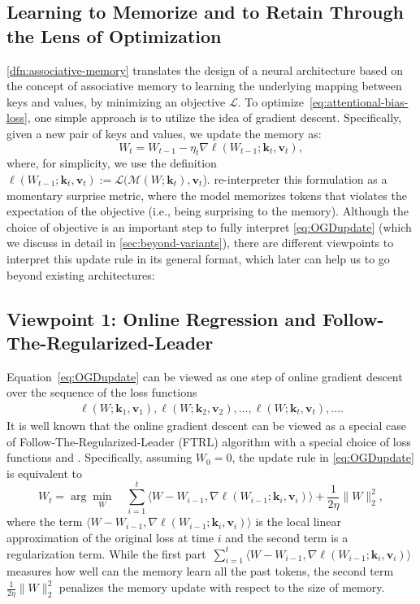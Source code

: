 \documentclass{article}
\newcommand{\citep}{\parencite}
\newcommand{\citet}{\textcite}
\newcommand{\vk}[0]{\mathbf{k}}
\newcommand{\vvv}[0]{\mathbf{v}}
\newcommand{\M}[0]{\mathcal{M}}
\theoremstyle{plain}
\theoremstyle{definition}
\theoremstyle{remark}
\begin{document}
\subsection{Learning to Memorize and to Retain Through the Lens of Optimization}
\autoref{dfn:associative-memory} translates the design of a neural architecture based on the concept of associative memory to learning the underlying mapping between keys and values, by minimizing an objective $\mathcal{L}$. To optimize~\autoref{eq:attentional-bias-loss}, one simple approach is to utilize the idea of gradient descent. Specifically, given a new pair of keys and values, we update the memory as:
\begin{equation} \label{eq:OGDupdate} 
    W_t = W_{t-1} - \eta_t \nabla \ell (W_{t-1};\vk_t, \vvv_t),  
\end{equation}
where, for simplicity, we use the definition $\ell (W_{t-1};\vk_t, \vvv_t) := \mathcal{L}(\M(W; \vk_t), \vvv_t$). 
\citet{behrouz2024titans} re-interpreter this formulation as a momentary surprise metric, where the model memorizes tokens that violates the expectation of the objective (i.e., being surprising to the memory). Although the choice of objective is an important step to fully interpret \autoref{eq:OGDupdate} (which we discuss in detail in \autoref{sec:beyond-variants}), there are different viewpoints to interpret this update rule in its general format, which later can help us to go beyond existing architectures:

\subsection{Viewpoint 1: Online Regression and Follow-The-Regularized-Leader}
Equation~\eqref{eq:OGDupdate} can be viewed as one step of online gradient descent over the sequence of the loss functions 
\begin{align}
    \ell(W;\vk_1, \vvv_1), \ell(W;\vk_2, \vvv_2), \ldots, \ell(W;\vk_t, \vvv_t), \ldots.
\end{align}
It is well known that the online gradient descent can be viewed as a special case of Follow-The-Regularized-Leader (FTRL) algorithm with a special choice of loss functions \citep[Chapter~2]{shalev2012online} and \citep{hazan2016introduction}. 
Specifically, assuming $W_0=0$, the update rule in \eqref{eq:OGDupdate} is equivalent to 
\begin{equation} \label{eq:OGDasFTRL}
W_{t} = \arg\min_{W}\quad \sum_{i=1}^t \langle W-W_{i-1} , \nabla \ell(W_{i-1};\vk_i, \vvv_i) \rangle  + \frac{1}{2\eta} \|W\|_2^2,
\end{equation}
where the term $\langle W-W_{i-1} , \nabla \ell(W_{i-1};\vk_i, \vvv_i) \rangle$ is the local linear approximation of the original loss at time $i$ and the second term is a regularization term.  While the first part~$ \sum_{i=1}^t \langle W-W_{i-1} , \nabla \ell(W_{i-1};\vk_i, \vvv_i) \rangle$ measures how well can the memory learn all the past tokens, the second term~
$\frac{1}{2\eta} \|W\|_2^2$ penalizes the memory update with respect to the size of memory. 
\end{document}
